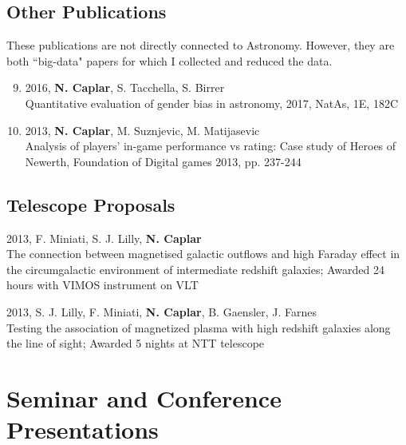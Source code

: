 \documentclass[11pt,letterpaper]{article}
\renewenvironment{itemize}{
  \begin{list}{}{
    \setlength{\leftmargin}{1.5em}
    \setlength{\itemsep}{0.10em}
    \setlength{\parskip}{0pt}
    \setlength{\parsep}{0.10em}
  }
}{
  \end{list}
}
\begin{document}
\newpage 
\subsection*{Other Publications}

These publications are not directly connected to Astronomy. However, they are both ``big-data" papers for which I collected and reduced the data.

\begin{enumerate}
\setcounter{enumi}{8}
\item 2016, \textbf{N. Caplar}, S. Tacchella, S. Birrer \\ Quantitative evaluation of gender bias in astronomy,  2017, NatAs, 1E, 182C

\item 2013,  \textbf{N. Caplar}, M. Suznjevic, M. Matijasevic  \\ Analysis of players' in-game performance vs rating: Case study of Heroes of Newerth, Foundation of Digital games 2013,  pp. 237-244
\end{enumerate}

\subsection*{Telescope Proposals}
\begin{itemize}
\item 2013, F. Miniati, S. J. Lilly, \textbf{N. Caplar} \\ The connection between magnetised galactic outflows and high Faraday effect in the circumgalactic environment of intermediate redshift galaxies;  Awarded 24 hours with VIMOS instrument on VLT
\item 2013, S. J. Lilly, F. Miniati,  \textbf{N. Caplar}, B. Gaensler, J. Farnes  \\ Testing the association of magnetized plasma with high redshift galaxies along the line of sight; 
Awarded 5 nights at NTT telescope
\end{itemize}

\section*{Seminar and Conference Presentations}
\end{document}
